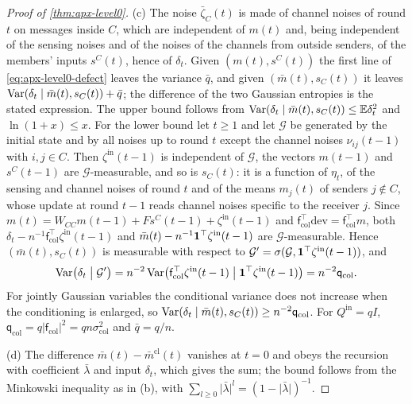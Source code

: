 \begin{proof}[Proof of \cref{thm:apx-level0}]
(c) The noise $\bar\zeta_C(t)$ is made of channel noises of round $t$ on messages inside $C$, which are independent of $m(t)$ and, being independent of the sensing noises and of the noises of the channels from outside senders, of the members' inputs $s^C(t)$, hence of $\delta_t$. Given $(m(t),s^C(t))$ the first line of \eqref{eq:apx-level0-defect} leaves the variance $\bar q$, and given $(\bar m(t),s_C(t))$ it leaves $\operatorname{Var}(\delta_t\mid\bar m(t),s_C(t))+\bar q$; the difference of the two Gaussian entropies is the stated expression. The upper bound follows from $\operatorname{Var}(\delta_t\mid\bar m(t),s_C(t))\le\mathbb{E}\delta_t^2$ and $\ln(1+x)\le x$. For the lower bound let $t\ge1$ and let $\mathcal G$ be generated by the initial state and by all noises up to round $t$ except the channel noises $\nu_{ij}(t-1)$ with $i,j\in C$. Then $\zeta^{\mathrm{in}}(t-1)$ is independent of $\mathcal G$, the vectors $m(t-1)$ and $s^C(t-1)$ are $\mathcal G$-measurable, and so is $s_C(t)$: it is a function of $\eta_t$, of the sensing and channel noises of round $t$ and of the means $m_j(t)$ of senders $j\notin C$, whose update at round $t-1$ reads channel noises specific to the receiver $j$. Since $m(t)=W_{CC}m(t-1)+Fs^C(t-1)+\zeta^{\mathrm{in}}(t-1)$ and $\mathsf f_{\mathrm{col}}^\top\mathrm{dev}=\mathsf f_{\mathrm{col}}^\top m$, both $\delta_t-n^{-1}\mathsf f_{\mathrm{col}}^\top\zeta^{\mathrm{in}}(t-1)$ and $\bar m(t)-n^{-1}\mathbf{1}^\top\zeta^{\mathrm{in}}(t-1)$ are $\mathcal G$-measurable. Hence $(\bar m(t),s_C(t))$ is measurable with respect to $\mathcal G'=\sigma(\mathcal G,\mathbf{1}^\top\zeta^{\mathrm{in}}(t-1))$, and
\begin{equation*}
\operatorname{Var}\bigl(\delta_t\bigm|\mathcal G'\bigr)=n^{-2}\operatorname{Var}\bigl(\mathsf f_{\mathrm{col}}^\top\zeta^{\mathrm{in}}(t-1)\bigm|\mathbf{1}^\top\zeta^{\mathrm{in}}(t-1)\bigr)=n^{-2}\mathsf q_{\mathrm{col}} .
\end{equation*}
For jointly Gaussian variables the conditional variance does not increase when the conditioning is enlarged, so $\operatorname{Var}(\delta_t\mid\bar m(t),s_C(t))\ge n^{-2}\mathsf q_{\mathrm{col}}$. For $Q^{\mathrm{in}}=qI$, $\mathsf q_{\mathrm{col}}=q\lvert\mathsf f_{\mathrm{col}}\rvert^2=qn\sigma_{\mathrm{col}}^2$ and $\bar q=q/n$.

(d) The difference $\bar m(t)-\bar m^{\mathrm{cl}}(t)$ vanishes at $t=0$ and obeys the recursion with coefficient $\bar\lambda$ and input $\delta_t$, which gives the sum; the bound follows from the Minkowski inequality as in (b), with $\sum_{l\ge0}\lvert\bar\lambda\rvert^l=(1-\lvert\bar\lambda\rvert)^{-1}$.


\end{proof}
